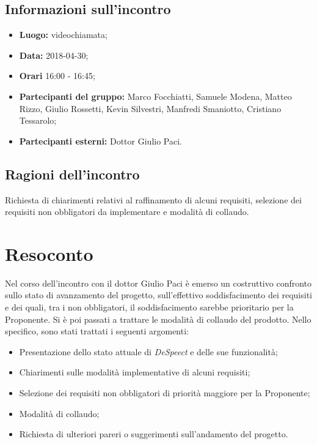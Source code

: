 \documentclass[openany,12pt,a4paper]{article}
\begin{document}
  \subsection{Informazioni sull'incontro} 
   
  \begin{itemize}  
      \item \textbf{Luogo:} videochiamata;
      \item \textbf{Data:} 2018-04-30; 
      \item \textbf{Orari} 16:00 - 16:45;
      \item \textbf{Partecipanti del gruppo:} Marco Focchiatti, Samuele Modena, Matteo Rizzo, Giulio Rossetti, Kevin Silvestri, Manfredi Smaniotto, Cristiano Tessarolo; 
      \item \textbf{Partecipanti esterni:} Dottor Giulio Paci. 
  \end{itemize} 
 
  \subsection{Ragioni dell'incontro} 
  Richiesta di chiarimenti relativi al raffinamento di alcuni requisiti, selezione dei requisiti non obbligatori da implementare e modalità di collaudo. 
 
  \section{Resoconto} 
  Nel corso dell'incontro con il dottor Giulio Paci è emerso un costruttivo confronto sullo stato di avanzamento del progetto, sull'effettivo soddisfacimento dei requisiti e dei quali, tra i non obbligatori, il soddisfacimento sarebbe prioritario per la Proponente. Si è poi passati a trattare le modalità di collaudo del prodotto. Nello specifico, sono stati trattati i seguenti argomenti: 
  
  \begin{itemize}
  	\item Presentazione dello stato attuale di \textit{DeSpeect} e delle sue funzionalità;
    \item Chiarimenti sulle modalità implementative di alcuni requisiti;
    \item Selezione dei requisiti non obbligatori di priorità maggiore per la Proponente;
    \item Modalità di collaudo;
    \item Richiesta di ulteriori pareri o suggerimenti sull'andamento del progetto.
    
  \end{itemize}
  
\end{document}
